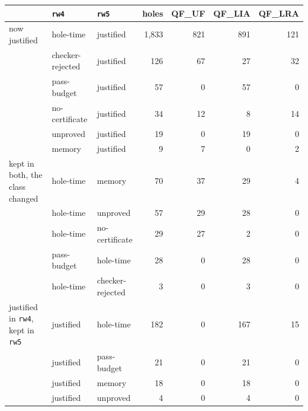 \begin{tabular}{lllrrrr}
\toprule
 & \texttt{rw4} & \texttt{rw5} & holes & QF\_UF & QF\_LIA & QF\_LRA \\
\midrule
now justified & hole-time & justified & 1,833 & 821 & 891 & 121 \\
 & checker-rejected & justified & 126 & 67 & 27 & 32 \\
 & pass-budget & justified & 57 & 0 & 57 & 0 \\
 & no-certificate & justified & 34 & 12 & 8 & 14 \\
 & unproved & justified & 19 & 0 & 19 & 0 \\
 & memory & justified & 9 & 7 & 0 & 2 \\
\midrule
kept in both, the class changed & hole-time & memory & 70 & 37 & 29 & 4 \\
 & hole-time & unproved & 57 & 29 & 28 & 0 \\
 & hole-time & no-certificate & 29 & 27 & 2 & 0 \\
 & pass-budget & hole-time & 28 & 0 & 28 & 0 \\
 & hole-time & checker-rejected & 3 & 0 & 3 & 0 \\
\midrule
justified in \texttt{rw4}, kept in \texttt{rw5} & justified & hole-time & 182 & 0 & 167 & 15 \\
 & justified & pass-budget & 21 & 0 & 21 & 0 \\
 & justified & memory & 18 & 0 & 18 & 0 \\
 & justified & unproved & 4 & 0 & 4 & 0 \\
\bottomrule
\end{tabular}
